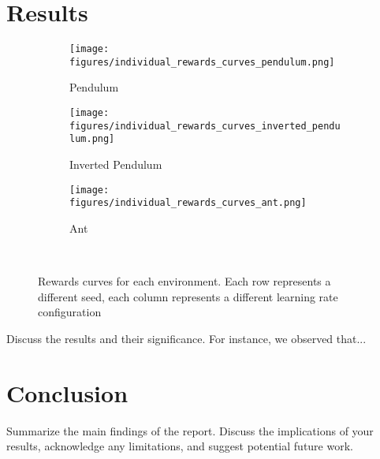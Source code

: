 \documentclass{article}
\begin{document}
\section{Results}
\begin{figure}[ht]
    \centering
    \begin{subfigure}{0.48\textwidth}
        \centering
        \texttt{[image: figures/individual\_rewards\_curves\_pendulum.png]}
        \caption{Pendulum}
    \end{subfigure}
    \begin{subfigure}{0.48\textwidth}
        \centering
        \texttt{[image: figures/individual\_rewards\_curves\_inverted\_pendulum.png]}
        \caption{Inverted Pendulum}
    \end{subfigure}
    \begin{subfigure}{0.48\textwidth}
        \centering
        \texttt{[image: figures/individual\_rewards\_curves\_ant.png]}
        \caption{Ant}
    \end{subfigure}
    \captionsetup{justification=centering} \
    \caption{Rewards curves for each environment. Each row represents a different seed, each column represents a different learning rate configuration}
\end{figure}

Discuss the results and their significance. For instance, we observed that...

\section{Conclusion}
Summarize the main findings of the report. Discuss the implications of your results, acknowledge any limitations, and suggest potential future work.

\end{document}
